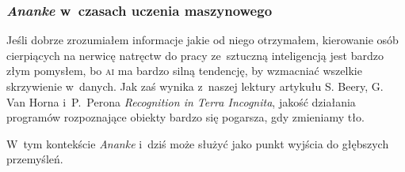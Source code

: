 \documentclass[10pt,t]{beamer}
\begin{document}
\begin{frame}
  \frametitle{\textit{Ananke} w~czasach uczenia maszynowego}


  Jeśli dobrze zrozumiałem informacje jakie od niego otrzymałem,
  kierowanie osób cierpiących na nerwicę natręctw do pracy ze~sztuczną
  inteligencją jest bardzo złym pomysłem, bo \textsc{ai} ma bardzo silną
  tendencję, by wzmacniać wszelkie skrzywienie w~danych. Jak zaś wynika
  z~naszej lektury artykułu S. Beery, G. Van Horna i~P.~Perona
  \textit{Recognition in Terra Incognita}, jakość działania programów
  rozpoznające obiekty bardzo się pogarsza, gdy zmieniamy tło.

  W~tym kontekście \textit{Ananke} i~dziś może służyć jako punkt wyjścia
  do głębszych przemyśleń.

\end{frame}














\end{document}
